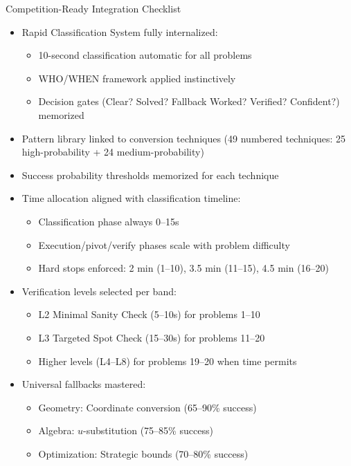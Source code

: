 \documentclass{article}
\begin{document}
\begin{masterybox}{Competition-Ready Integration Checklist}
\begin{itemize}[nosep]
\item[$\square$] Rapid Classification System fully internalized:
  \begin{itemize}[nosep]
  \item[$\square$] 10-second classification automatic for all problems
  \item[$\square$] WHO/WHEN framework applied instinctively
  \item[$\square$] Decision gates (Clear? Solved? Fallback Worked? Verified? Confident?) memorized
  \end{itemize}
\item[$\square$] Pattern library linked to conversion techniques (49 numbered techniques: 25 high-probability + 24 medium-probability)
\item[$\square$] Success probability thresholds memorized for each technique
\item[$\square$] Time allocation aligned with classification timeline:
  \begin{itemize}[nosep]
  \item[$\square$] Classification phase always 0--15s
  \item[$\square$] Execution/pivot/verify phases scale with problem difficulty
  \item[$\square$] Hard stops enforced: 2 min (1--10), 3.5 min (11--15), 4.5 min (16--20)
  \end{itemize}
\item[$\square$] Verification levels selected per band:
  \begin{itemize}[nosep]
  \item[$\square$] L2 Minimal Sanity Check (5--10s) for problems 1--10
  \item[$\square$] L3 Targeted Spot Check (15--30s) for problems 11--20
  \item[$\square$] Higher levels (L4--L8) for problems 19--20 when time permits
  \end{itemize}
\item[$\square$] Universal fallbacks mastered:
  \begin{itemize}[nosep]
  \item[$\square$] Geometry: Coordinate conversion (65--90\% success)
  \item[$\square$] Algebra: $u$-substitution (75--85\% success)
  \item[$\square$] Optimization: Strategic bounds (70--80\% success)

\end{itemize}
\end{itemize}
\end{masterybox}
\end{document}
